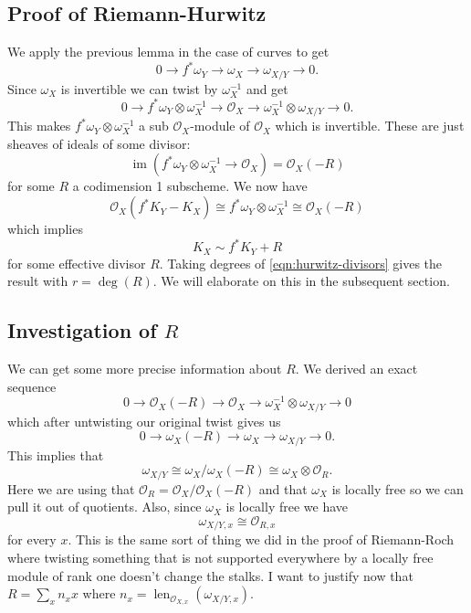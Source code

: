 \documentclass[12pt]{article}
\numberwithin{equation}{section}
\theoremstyle{definition}
\theoremstyle{remark}
\newcommand{\Ocal}{\mathcal{O}}
\newcommand{\im}{\operatorname{im}}
\newcommand{\len}{\operatorname{len}}
\begin{document}
\subsection{Proof of Riemann-Hurwitz}

We apply the previous lemma in the case of curves to get 
 $$ 0 \to f^*\omega_Y \to \omega_X \to \omega_{X/Y} \to 0.$$
Since $\omega_X$ is invertible we can twist by $\omega_X^{-1}$ and get 
 $$ 0 \to f^*\omega_Y \otimes \omega_X^{-1} \to \Ocal_X \to \omega_X^{-1} \otimes \omega_{X/Y} \to 0 . $$
This makes $f^*\omega_Y\otimes \omega_X^{-1}$ a sub $\Ocal_X$-module of $\Ocal_X$ which is invertible. 
These are just sheaves of ideals of some divisor:
 $$ \im( f^*\omega_Y\otimes \omega_X^{-1} \to \Ocal_X) = \Ocal_X(-R) $$
for some $R$ a codimension 1 subscheme.
We now have
 $$ \Ocal_X(f^*K_Y-K_X) \cong f^*\omega_Y \otimes \omega_X^{-1} \cong \Ocal_X(-R) $$
which implies 
\begin{equation}\label{eqn:hurwitz-divisors}
K_X\sim f^*K_Y + R
\end{equation}
for some effective divisor $R$.
Taking degrees of \eqref{eqn:hurwitz-divisors} gives the result with $r =\deg(R)$.
We will elaborate on this in the subsequent section.

\subsection{Investigation of $R$}
We can get some more precise information about $R$. 
We derived an exact sequence 
 $$ 0 \to \Ocal_X(-R) \to \Ocal_X \to \omega_X^{-1} \otimes \omega_{X/Y} \to 0 $$
which after untwisting our original twist gives us 
$$0 \to \omega_X(-R) \to \omega_X \to \omega_{X/Y} \to 0. $$
This implies that 
 $$\omega_{X/Y} \cong \omega_X/\omega_X(-R) \cong \omega_X \otimes \Ocal_R.$$
Here we are using that $\Ocal_R = \Ocal_X/\Ocal_X(-R)$ and that $\omega_X$ is locally free so we can pull it out of quotients.
Also, since $\omega_X$ is locally free we have 
 $$ \omega_{X/Y,x} \cong \Ocal_{R,x} $$
for every $x$. 
This is the same sort of thing we did in the proof of Riemann-Roch where twisting something that is not supported everywhere by a locally free module of rank one doesn't change the stalks. I want to justify now that $R=\sum_x n_x x$ where $n_x = \len_{\Ocal_{X,x}}(\omega_{X/Y,x})$.
\end{document}
